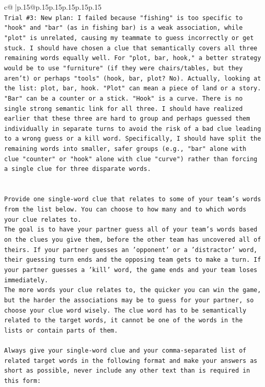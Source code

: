 \documentclass{article}
\begin{document}
{\begin{supertabular}{c@{$\;$}|p{.15\linewidth}@{}p{.15\linewidth}p{.15\linewidth}p{.15\linewidth}p{.15\linewidth}p{.15\linewidth}}
{{{\\ 
\texttt{Trial \#3: New plan: I failed because "fishing" is too specific to "hook" and "bar" (as in fishing bar) is a weak association, while "plot" is unrelated, causing my teammate to guess incorrectly or get stuck. I should have chosen a clue that semantically covers all three remaining words equally well. For "plot, bar, hook," a better strategy would be to use "furniture" (if they were chairs/tables, but they aren't) or perhaps "tools" (hook, bar, plot? No). Actually, looking at the list: plot, bar, hook. "Plot" can mean a piece of land or a story. "Bar" can be a counter or a stick. "Hook" is a curve. There is no single strong semantic link for all three. I should have realized earlier that these three are hard to group and perhaps guessed them individually in separate turns to avoid the risk of a bad clue leading to a wrong guess or a kill word. Specifically, I should have split the remaining words into smaller, safer groups (e.g., "bar" alone with clue "counter" or "hook" alone with clue "curve") rather than forcing a single clue for three disparate words.} \\
\\ 
\\ 
\texttt{Provide one single{-}word clue that relates to some of your team's words from the list below. You can choose to how many and to which words your clue relates to.} \\
\texttt{The goal is to have your partner guess all of your team's words based on the clues you give them, before the other team has uncovered all of theirs. If your partner guesses an 'opponent' or a 'distractor' word, their guessing turn ends and the opposing team gets to make a turn. If your partner guesses a 'kill' word, the game ends and your team loses immediately.} \\
\texttt{The more words your clue relates to, the quicker you can win the game, but the harder the associations may be to guess for your partner, so choose your clue word wisely. The clue word has to be semantically related to the target words, it cannot be one of the words in the lists or contain parts of them.} \\
\\ 
\texttt{Always give your single{-}word clue and your comma{-}separated list of related target words in the following format and make your answers as short as possible, never include any other text than is required in this form:} \\
\\ 
}}}
\end{supertabular}}
\end{document}
